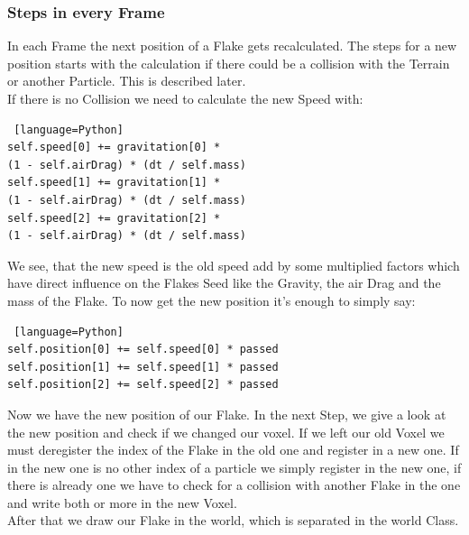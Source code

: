 \documentclass{sig-alternate-05-2015}
\begin{document}
\subsubsection{Steps in every Frame}
In each Frame the next position of a Flake gets recalculated. The steps for a new position starts with the calculation if there could be a collision with the Terrain or another Particle. This is described later. \\
If there is no Collision we need to calculate the new Speed with:\\
\begin{lstlisting} [language=Python]
self.speed[0] += gravitation[0] * 
(1 - self.airDrag) * (dt / self.mass)
self.speed[1] += gravitation[1] * 
(1 - self.airDrag) * (dt / self.mass)
self.speed[2] += gravitation[2] * 
(1 - self.airDrag) * (dt / self.mass)
\end{lstlisting}
We see, that the new speed is the old speed add by some multiplied factors which have direct influence on the Flakes Seed like the Gravity, the air Drag and the mass of the Flake. To now get the new position it’s enough to simply say: \\
\begin{lstlisting} [language=Python]
self.position[0] += self.speed[0] * passed
self.position[1] += self.speed[1] * passed
self.position[2] += self.speed[2] * passed
\end{lstlisting}
Now we have the new position of our Flake. In the next Step, we give a look at the new position and check if we changed our voxel. If we left our old Voxel we must deregister the index of the Flake in the old one and register in a new one. If in the new one is no other index of a particle we simply register in the new one, if there is already one we have to check for a collision with another Flake in the one and write both or more in the new Voxel. \\
After that we draw our Flake in the world, which is separated in the world Class. \\
\end{document}
